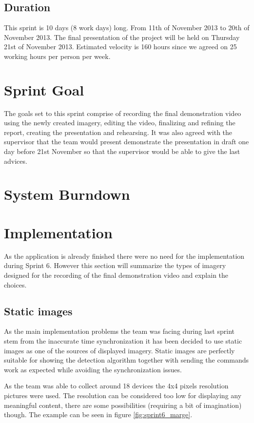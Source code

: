 \subsection{Duration}
This sprint is 10 days (8 work days) long. From 11th of November 2013 to 20th of November 2013. The final presentation of the project will be held on Thursday 21st of November 2013.
Estimated velocity is 160 hours since we agreed on 25 working hours per person per week. 

\section{Sprint Goal}
The goals set to this sprint comprise of recording the final demonstration video using the newly created imagery, editing the video, finalizing and refining the report, creating the presentation and rehearsing. It was also agreed with the supervisor that the team would present demonstrate the presentation in draft one day before 21st November so that the supervisor would be able to give the last advices.

\section{System Burndown}

\section{Implementation}
As the application is already finished there were no need for the implementation during Sprint 6. However this section will summarize the types of imagery designed for the recording of the final demonstration video and explain the choices.

\subsection{Static images}
As the main implementation problems the team was facing during last sprint stem from the inaccurate time synchronization it has been decided to use static images as one of the sources of displayed imagery. Static images are perfectly suitable for showing the detection algorithm together with sending the commands work as expected while avoiding the synchronization issues.

As the team was able to collect around 18 devices the 4x4 pixels resolution pictures were used. The resolution can be considered too low for displaying any meaningful content, there are some possibilities (requiring a bit of imagination) though. The example can be seen in figure \ref{fig:sprint6_marge}.


